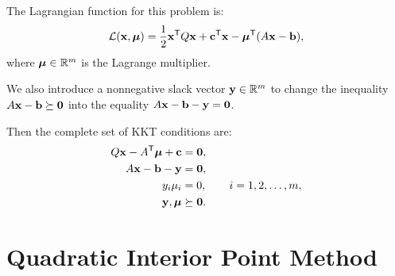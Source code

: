 The Lagrangian function for this problem is:
\begin{align}
\mathcal{L}(\mathbf{x},\boldsymbol{\mu}) = \frac{1}{2}\mathbf{x}^{\mathsf T} Q\mathbf{x} + \mathbf{c}^{\mathsf T} \mathbf{x} - \boldsymbol{\mu}^{\mathsf T} (A\mathbf{x} -\mathbf{b}),
\label{eq:lagrangian}
\end{align}
where $\boldsymbol{\mu} \in \mathbb{R}^m$ is the Lagrange multiplier.

 %

We also introduce a nonnegative slack vector $\mathbf{y}\in\mathbb{R}^m$ to change the inequality
$A\mathbf{x} - \mathbf{b} \succeq \mathbf{0}$ into the equality $A\mathbf{x} - \mathbf{b} - \mathbf{y} = \mathbf{0}$.

Then the complete set of KKT conditions are:
\begin{align*}
Q\mathbf{x} - A^{\mathsf T} \boldsymbol{\mu} + \mathbf{c} &= \mathbf{0},\\
A\mathbf{x} - \mathbf{b} - \mathbf{y} &= \mathbf{0},\\
y_i\mu_i &= 0, \qquad i=1,2,\ldots,m,\\
\mathbf{y},\boldsymbol{\mu} &\succeq \mathbf{0}.
\end{align*}

\section*{Quadratic Interior Point Method}

